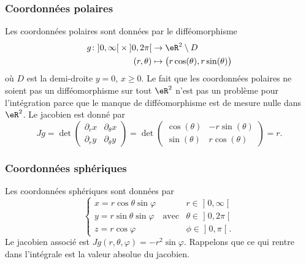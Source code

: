 \subsubsection{Coordonnées polaires}

Les coordonnées polaires sont données par le difféomorphisme
\begin{equation}
	\begin{aligned}
		g\colon \mathopen]0,\infty\mathclose[\times\mathopen]0,2\pi\mathclose[ & \to\eR^2\setminus D                             \\
		(r,\theta)                                                             & \mapsto \big( r\cos(\theta),r\sin(\theta) \big)
	\end{aligned}
\end{equation}
où \( D\) est la demi-droite \( y=0\), \( x\geq 0\). Le fait que les coordonnées polaires ne soient pas un difféomorphisme sur tout \( \eR^2\) n'est pas un problème pour l'intégration parce que le manque de difféomorphisme est de mesure nulle dans \( \eR^2\). Le jacobien est donné par
\begin{equation}
	Jg=\det\begin{pmatrix}
		\partial_rx & \partial_{\theta}x \\
		\partial_ry & \partial_{\theta}y
	\end{pmatrix}=\det\begin{pmatrix}
		\cos(\theta) & -r\sin(\theta) \\
		\sin(\theta) & r\cos(\theta)
	\end{pmatrix}=r.
\end{equation}

\subsubsection{Coordonnées sphériques}
\label{SubSubCoordSpJxhMwm}

Les coordonnées sphériques sont données par
\begin{equation}		\label{OMEqChmVarSpherique}
	\left\{
	\begin{array}{lllll}
		x=r\cos\theta\sin\varphi &             & r\in\mathopen] 0 , \infty \mathclose[    \\
		y=r\sin\theta\sin\varphi & \text{avec} & \theta\in\mathopen] 0 , 2\pi \mathclose[ \\
		z=r\cos\varphi           &             & \phi\in\mathopen] 0 , \pi \mathclose[.
	\end{array}
	\right.
\end{equation}
Le jacobien associé est \( Jg(r,\theta,\varphi)=-r^2\sin\varphi\). Rappelons que ce qui rentre dans l'intégrale est la valeur absolue du jacobien.

